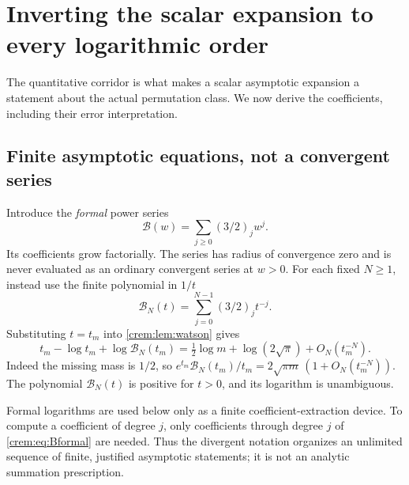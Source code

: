 \documentclass[11pt,a4paper]{article}
\theoremstyle{definition}\newaliascnt{definition}{theorem}
\theoremstyle{remark}\newaliascnt{remark}{theorem}
\newcommand{\Bformal}{\mathcal B}%
\begin{document}
\section{Inverting the scalar expansion to every logarithmic order}
\label{crem:sec:inversion}
The quantitative corridor is what makes a scalar asymptotic expansion a
statement about the actual permutation class. We now derive the
coefficients, including their error interpretation.

\subsection{Finite asymptotic equations, not a convergent series}
Introduce the \emph{formal} power series
\begin{equation}
 \Bformal(w)=\sum_{j\ge0}(3/2)_j w^j.
 \label{crem:eq:Bformal}
\end{equation}
Its coefficients grow factorially. The series has radius of convergence
zero and is never evaluated as an ordinary convergent series at $w>0$. For
each fixed $N\ge1$, instead use the finite polynomial in $1/t$
\[
 \Bformal_N(t)=\sum_{j=0}^{N-1}(3/2)_jt^{-j}.
\]
Substituting $t=t_m$ into \cref{crem:lem:watson} gives
\begin{equation}
 t_m-\log t_m+\log\Bformal_N(t_m)
 =\tfrac12\log m+\log(2\sqrt\pi)+O_N(t_m^{-N}).
 \label{crem:eq:finite-root-equation}
\end{equation}
Indeed the missing mass is $1/2$, so
$e^{t_m}\Bformal_N(t_m)/t_m=2\sqrt{\pi m}\,(1+O_N(t_m^{-N}))$. The
polynomial $\Bformal_N(t)$ is positive for $t>0$, and its logarithm is
unambiguous.

Formal logarithms are used below only as a finite coefficient-extraction
device. To compute a coefficient of degree $j$, only coefficients through
degree $j$ of \eqref{crem:eq:Bformal} are needed. Thus the divergent notation
organizes an unlimited sequence of finite, justified asymptotic statements;
it is not an analytic summation prescription.
\end{document}
